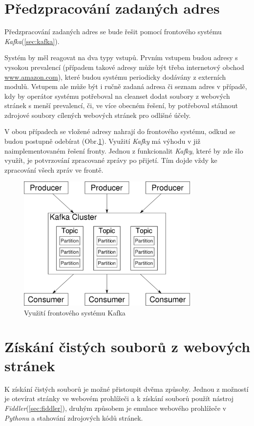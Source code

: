 \documentclass[thesis=M,czech,hidelinks]{FITthesis}[2013/05/06]
\begin{document}
\section{Předzpracování zadaných adres}
Předzpracování zadaných adres  se bude řešit pomocí frontového systému \textit{Kafka}(\ref{sec:kafka}).

Systém by měl reagovat na dva typy vstupů. Prvním vstupem budou adresy s vysokou prevalencí (případem takové adresy může být třeba internetový obchod \url{www.amazon.com}), které budou systému periodicky dodávány z externích modulů. Vstupem ale může být i ručně zadaná adresa či seznam adres v případě, kdy by operátor systému potřeboval na cleanset dodat soubory z webových stránek s menší prevalencí, či, ve více obecném řešení, by potřeboval stáhnout zdrojové soubory cílených webových stránek pro odlišné účely.

V obou případech se vložené adresy nahrají do frontového systému, odkud se budou postupně odebírat (Obr.\ref{fig:kafka_schema}). Využití \textit{Kafky} má výhodu v již naimplementovaném řešení fronty. Jednou z funkcionalit \textit{Kafky}, které by zde šlo využít, je potvrzování zpracované zprávy po přijetí. Tím dojde vždy ke zpracování všech zpráv ve frontě. 

\begin{figure}[h]
	\centering
	\includegraphics[width=9cm]{pictures/kafka.png}
	\caption{Využití frontového systému Kafka}
	\label{fig:kafka_schema}
\end{figure}




\section{Získání čistých souborů z webových stránek}
K získání čistých souborů je možné přistoupit dvěma způsoby. Jednou z možností je otevírat stránky ve webovém prohlížeči a k získání souborů použít nástroj \textit{Fiddler}(\ref{sec:fiddler}), druhým způsobem je emulace webového prohlížeče v \textit{Pythonu} a stahování zdrojových kódů stránek. 
\end{document}
